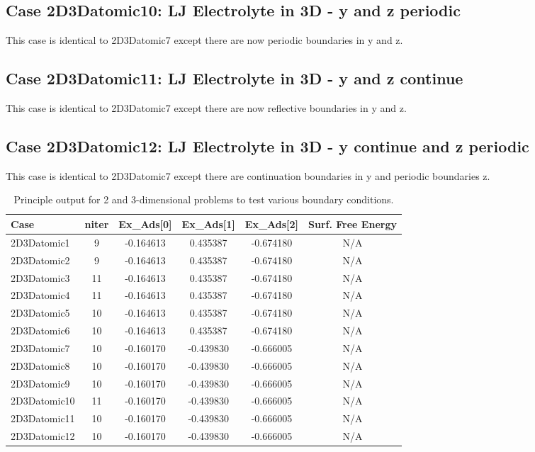 \documentclass[10pt,onecolumn]{article}
\begin{document}
\subsection{Case 2D3Datomic10: LJ Electrolyte in 3D - y and z periodic}
This case is identical to 2D3Datomic7 except there are now periodic boundaries 
in y and z.

\subsection{Case 2D3Datomic11: LJ Electrolyte in 3D - y and z continue}
This case is identical to 2D3Datomic7 except there are now 
reflective boundaries in y and z.

\subsection{Case 2D3Datomic12: LJ Electrolyte in 3D - y continue and z periodic}
This case is identical to 2D3Datomic7 except there are continuation boundaries in 
y and periodic boundaries z.


\begin{table}[h]\begin{tabular}{|l|c|c|c|c|c|}
\hline
Case & niter & Ex\_Ads[0]  & Ex\_Ads[1] & Ex\_Ads[2] & Surf. Free Energy  \\
\hline
2D3Datomic1 & 9 & -0.164613 & 0.435387 & -0.674180  & N/A   \\
2D3Datomic2 & 9 & -0.164613 & 0.435387 & -0.674180  & N/A   \\
2D3Datomic3 & 11 & -0.164613 & 0.435387 & -0.674180  & N/A   \\
2D3Datomic4 & 11 & -0.164613 & 0.435387 & -0.674180  & N/A   \\
2D3Datomic5 & 10 & -0.164613 & 0.435387 & -0.674180  & N/A   \\
2D3Datomic6 & 10 & -0.164613 & 0.435387 & -0.674180  & N/A   \\
2D3Datomic7 & 10 & -0.160170 & -0.439830  & -0.666005  & N/A   \\
2D3Datomic8 & 10 & -0.160170 & -0.439830  & -0.666005  & N/A   \\
2D3Datomic9 & 10 & -0.160170 & -0.439830  & -0.666005  & N/A   \\
2D3Datomic10 & 11 & -0.160170 & -0.439830  & -0.666005  & N/A   \\
2D3Datomic11 & 10 & -0.160170 & -0.439830  & -0.666005  & N/A   \\
2D3Datomic12 & 10 & -0.160170 & -0.439830  & -0.666005  & N/A   \\
\hline
\end{tabular}
\label{tab:table1}
\caption{Principle output for 2 and 3-dimensional problems to test
various boundary conditions.}
\end{table}
\end{document}

